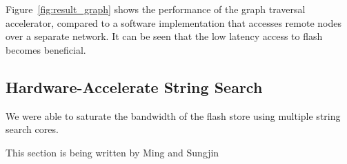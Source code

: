 Figure~\ref{fig:result_graph} shows the performance of the graph traversal
accelerator, compared to a software implementation that accesses remote nodes
over a separate network. It can be seen that the low latency access to flash
becomes beneficial.




\subsection{Hardware-Accelerate String Search}

We were able to saturate the bandwidth of the flash store using multiple string
search cores.

This section is being written by Ming and Sungjin

